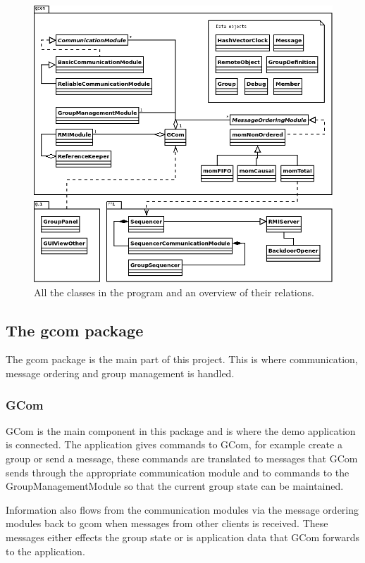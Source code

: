 \documentclass[english]{article}
\begin{document}
\begin{figure}
\includegraphics[width=\textwidth]{superuml.png}
\caption{All the classes in the program and an overview of their relations.}
\label{fig:overview}
\end{figure}

\subsection{The gcom package}
The gcom package is the main part of this project. This is where communication, message ordering and group management is handled. 

\subsubsection{GCom}
GCom is the main component in this package and is where the demo application is connected. The application gives commands to GCom, for example create a group or send a message, these commands are translated to messages that GCom sends through the appropriate communication module and to commands to the GroupManagementModule so that the current group state can be maintained.

Information also flows from the communication modules via the message ordering modules back to gcom when messages from other clients is received. These messages either effects the group state or is application data that GCom forwards to the application. 
\end{document}
